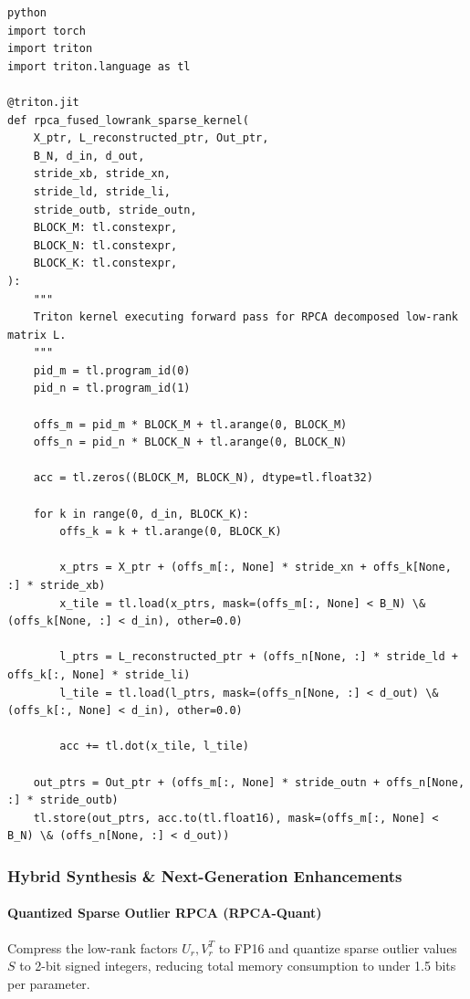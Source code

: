 \vspace{0.5em}
\begin{mdframed}[backgroundcolor=codebg, linecolor=codeframe, linewidth=1pt, roundcorner=4pt, innerleftmargin=2pt, innerrightmargin=5pt, innertopmargin=5pt, innerbottommargin=5pt]
\begin{lstlisting}
python
import torch
import triton
import triton.language as tl

@triton.jit
def rpca_fused_lowrank_sparse_kernel(
    X_ptr, L_reconstructed_ptr, Out_ptr,
    B_N, d_in, d_out,
    stride_xb, stride_xn,
    stride_ld, stride_li,
    stride_outb, stride_outn,
    BLOCK_M: tl.constexpr,
    BLOCK_N: tl.constexpr,
    BLOCK_K: tl.constexpr,
):
    """
    Triton kernel executing forward pass for RPCA decomposed low-rank matrix L.
    """
    pid_m = tl.program_id(0)
    pid_n = tl.program_id(1)

    offs_m = pid_m * BLOCK_M + tl.arange(0, BLOCK_M)
    offs_n = pid_n * BLOCK_N + tl.arange(0, BLOCK_N)

    acc = tl.zeros((BLOCK_M, BLOCK_N), dtype=tl.float32)

    for k in range(0, d_in, BLOCK_K):
        offs_k = k + tl.arange(0, BLOCK_K)

        x_ptrs = X_ptr + (offs_m[:, None] * stride_xn + offs_k[None, :] * stride_xb)
        x_tile = tl.load(x_ptrs, mask=(offs_m[:, None] < B_N) \& (offs_k[None, :] < d_in), other=0.0)

        l_ptrs = L_reconstructed_ptr + (offs_n[None, :] * stride_ld + offs_k[:, None] * stride_li)
        l_tile = tl.load(l_ptrs, mask=(offs_n[None, :] < d_out) \& (offs_k[:, None] < d_in), other=0.0)

        acc += tl.dot(x_tile, l_tile)

    out_ptrs = Out_ptr + (offs_m[:, None] * stride_outn + offs_n[None, :] * stride_outb)
    tl.store(out_ptrs, acc.to(tl.float16), mask=(offs_m[:, None] < B_N) \& (offs_n[None, :] < d_out))
\end{lstlisting}
\end{mdframed}
\vspace{0.5em}


\subsubsection*{Hybrid Synthesis \& Next-Generation Enhancements}

\paragraph{Quantized Sparse Outlier RPCA (RPCA-Quant)}
Compress the low-rank factors $U_r, V_r^T$ to FP16 and quantize sparse outlier values $S$ to 2-bit signed integers, reducing total memory consumption to under 1.5 bits per parameter.

